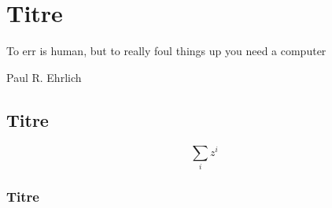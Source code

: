 \chapter{Titre}
\label{chap:lab2}

\epigraph{To err is human, but to really foul things up you need a
  computer}{Paul R. Ehrlich}

\minitoc %


\section[Titre dans le sommaire]{Titre}

\lipsum[1-1]

$$\sum_i z^i$$

\lipsum[2-2]

\subsection{Titre}

\lipsum[3-3]

